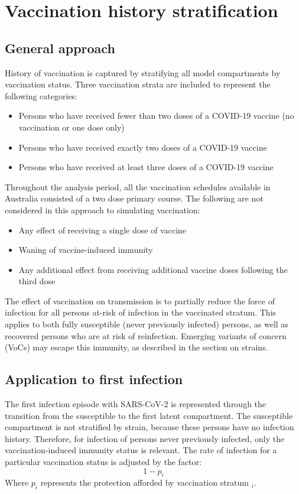 \section{Vaccination history stratification}
\subsection{General approach}
History of vaccination is captured by stratifying all model compartments by vaccination status.
Three vaccination strata are included to represent the following categories:
\begin{itemize}
    \item Persons who have received fewer than two doses of a COVID-19 vaccine (no vaccination or one dose only)
    \item Persons who have received exactly two doses of a COVID-19 vaccine
    \item Persons who have received at least three doses of a COVID-19 vaccine
\end{itemize}
Throughout the analysis period, all the vaccination schedules available in Australia
consisted of a two dose primary course.
The following are not considered in this approach to simulating vaccination:
\begin{itemize}
    \item Any effect of receiving a single dose of vaccine
    \item Waning of vaccine-induced immunity
    \item Any additional effect from receiving additional vaccine doses following the third dose
\end{itemize}
The effect of vaccination on transmission is to partially reduce 
the force of infection for all persons at-risk of infection in the vaccinated stratum.
This applies to both fully susceptible (never previously infected) persons,
as well as recovered persons who are at risk of reinfection.
Emerging variants of concern (VoCs) may escape this immunity, as described in the section on strains.

\subsection{Application to first infection}
The first infection episode with SARS-CoV-2 
is represented through the transition from the susceptible
to the first latent compartment.
The susceptible compartment is not stratified by strain,
because these persons have no infection history.
Therefore, for infection of persons never previously infected,
only the vaccination-induced immunity status is relevant.
The rate of infection for a particular vaccination status is adjusted by the factor:
\[1 - p_{i}\]
Where \(p_{i}\) represents the protection afforded by vaccination stratum \(_{i}\).

